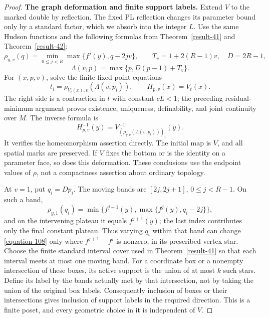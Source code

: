 \documentclass[11pt,a4paper]{article}
\theoremstyle{definition}
\begin{document}
\begin{proof}
\textbf{The graph deformation and finite support labels.}\quad
Extend $V$ to the marked double by reflection. The fixed PL
reflection changes its parameter bound only by a standard
factor, which we absorb into the integer $L$. Use the same
Hudson functions and the following formulas from Theorem~\ref{result-41} and
Theorem~\ref{result-42}:
\[
 \rho_{y,v}(q)=\min_{0\leq j<R}
       \max\{f^j(y),q-2jv\},\qquad
 T_v=1+2(R-1)v,\quad D=2R-1,
\]
\[
 \Lambda(v,p)=\max\{p,D(p-1)+T_v\}.
\]
For $(x,p,v)$, solve the finite fixed-point equations
\begin{equation}
 t_i=\rho_{V_t(x),v}(\Lambda(v,p_i)),\qquad
 H_{p,v}(x)=V_t(x).
 \label{equation-107}
\end{equation}
The right side is a contraction in $t$ with constant $cL<1$;
the preceding residual-minimum argument proves existence,
uniqueness, definability, and joint continuity over $M$.
The inverse formula is
\begin{equation}
 H_{p,v}^{-1}(y)=
 V^{-1}_{(\rho_{y,v}(\Lambda(v,p_i)))_i}(y).
 \label{equation-108}
\end{equation}
It verifies the homeomorphism assertion directly. The initial
map is $V$, and all spatial marks are preserved. If $V$ fixes
the bottom or is the identity on a parameter face, so does
this deformation. These conclusions use the endpoint values
of $\rho$, not a compactness assertion about ordinary topology.

At $v=1$, put $q_i=Dp_i$. The moving bands are
$[2j,2j+1]$, $0\le j<R-1$. On such a band,
\[
 \rho_{y,1}(q_i)=
 \min\{f^{j+1}(y),\max\{f^j(y),q_i-2j\}\},
\]
and on the intervening plateau it equals $f^{j+1}(y)$;
the last index contributes only the final constant plateau.
Thus varying $q_i$ within that band can change \eqref{equation-108} only
where $f^{j+1}-f^j$ is nonzero, in its prescribed vertex star.
Choose the finite standard interval cover used in Theorem~\ref{result-41} so
that each interval meets at most one moving band. For a
coordinate box or a nonempty intersection of these boxes,
its active support is the union of at most $k$ such stars.
Define its label by the bands actually met by that intersection,
not by taking the union of the original box labels. Consequently
inclusion of boxes or their intersections gives inclusion of
support labels in the required direction. This is a finite
poset, and every geometric choice in it is independent of $V$.


\end{proof}
\end{document}
